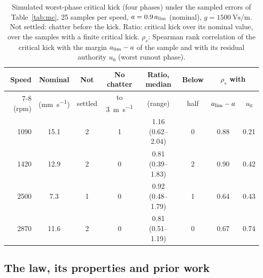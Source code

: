 \begin{table}[!tbp]
\centering
\caption{Simulated worst-phase critical kick (four phases) under the sampled errors of Table~\ref{tab:mc}, 25 samples per speed, $a=0.9\,a_{\lim}$ (nominal), $g=\SI{1500}{\volt\second\per\metre}$. Not settled: chatter before the kick. Ratio: critical kick over its nominal value, over the samples with a finite critical kick. $\rho_s$: Spearman rank correlation of the critical kick with the margin $a_{\lim}-a$ of the sample and with its residual authority $u_0$ (worst runout phase).}
\label{tab:mc-kick}
\small
\setlength{\tabcolsep}{4pt}
\begin{tabular}{@{}rccccccc@{}}
\toprule
Speed & Nominal & Not & No chatter & Ratio, median & Below & \multicolumn{2}{c}{$\rho_s$ with}\\
\cmidrule(l){7-8}
(rpm) & (\si{\milli\metre\per\second}) & settled & to \SI{3}{\metre\per\second} & (range) & half & $a_{\lim}-a$ & $u_0$\\
\midrule
1090 & 15.1 & 2 & 1 & 1.16 (0.62--2.04) & 0 & 0.88 & 0.21\\
1420 & 12.9 & 2 & 0 & 0.81 (0.39--1.83) & 2 & 0.90 & 0.42\\
2500 & 7.3  & 1 & 0 & 0.92 (0.48--1.79) & 1 & 0.64 & 0.43\\
2870 & 11.6 & 2 & 0 & 0.81 (0.51--1.19) & 0 & 0.67 & 0.74\\
\bottomrule
\end{tabular}
\end{table}

\subsection{The law, its properties and prior work}\label{supp:delayed-prior}

